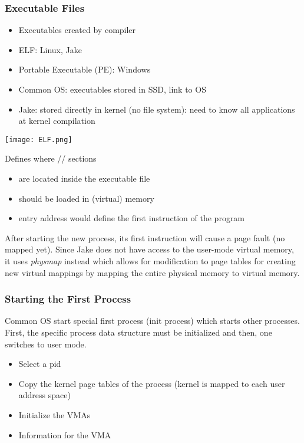 \subsubsection{Executable Files}
\begin{itemize}
    \item Executables created by compiler
    \item ELF: Linux, Jake
    \item Portable Executable (PE): Windows
    \item Common OS: executables stored in SSD, link to OS
    \item Jake: stored directly in kernel (no file system): need to know all applications at kernel compilation
\end{itemize}
\newpar{}
\newpar{}
\begin{center}
    \texttt{[image: ELF.png]}
\end{center}
Defines where // sections
\begin{itemize}
    \item are located inside the executable file
    \item should be loaded in (virtual) memory
    \item {} entry address would define the first instruction of the program
\end{itemize}

\newpar{}

After starting the new process, its first instruction will cause a page fault (no mapped yet). Since Jake does not have access to the user-mode virtual memory, it uses \textit{physmap} instead which allows for modification to page tables for creating new virtual mappings by mapping the entire physical memory to virtual memory.


\subsubsection{Starting the First Process}
Common OS start special first process (init process) which starts other processes. First, the specific process data structure must be initialized and then, one switches to user mode.
\begin{itemize}
    \item Select a pid
    \item Copy the kernel page tables of the process (kernel is mapped to each user address space)
    \item Initialize the VMAs
    \item Information for the  VMA
\end{itemize}

